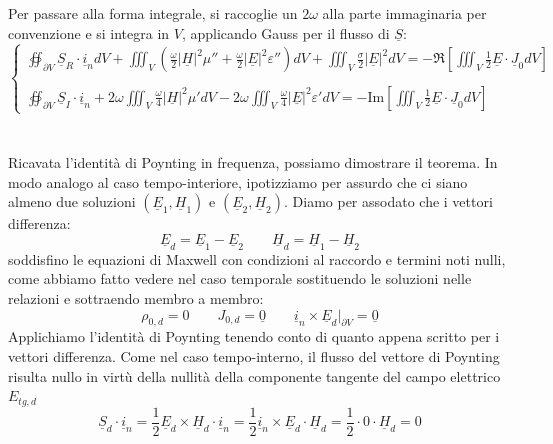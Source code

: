 \documentclass{book}
\begin{document}
        Per passare alla forma integrale, si raccoglie un $2\omega$ alla parte immaginaria per convenzione e si integra in $V$, applicando Gauss per il flusso di $\underline{S}$:
        \begin{equation}
            \begin{cases}
             \displaystyle \oiint_{\partial V}  \underline{S}_{R} \cdot \underline{i}_{n}dV+\iiint_{V} (\frac{\omega}{2}|\underline{H}|^{2}\mu''+\frac{\omega}{2}|\underline{E}|^{2}\varepsilon'')dV+\iiint_{V}\frac{\sigma}{2}|\underline{E}|^{2}dV=-\Re[\iiint_{V}\frac{1}{2}\underline{E}\cdot \underline{J}_{0} dV] \\ \\
             \displaystyle \oiint_{\partial V}  \underline{S}_{I} \cdot \underline{i}_{n}+ 2 \omega\iiint_{V} \frac{\omega}{4}|\underline{H}|^{2}\mu'dV-2 \omega\iiint_{V}\frac{\omega}{4}|\underline{E}|^{2}\varepsilon'dV=-\textrm{Im}[\iiint_{V}\frac{1}{2}\underline{E}\cdot \underline{J}_{0}dV]
        \end{cases}
        \end{equation}
         \\ \\
         Ricavata l'identità di Poynting in frequenza, possiamo dimostrare il teorema. In modo analogo al caso tempo-interiore, ipotizziamo per assurdo che ci siano almeno due soluzioni $(\underline{E}_{1}, \underline{H}_{1})$ e $(\underline{E}_{2}, \underline{H}_{2})$. Diamo per assodato che i vettori differenza:
         \begin{equation}
             \underline{E}_{d} = \underline{E}_{1}-\underline{E}_{2} \qquad \underline{H}_{d}=\underline{H}_{1}-\underline{H}_{2}
         \end{equation}
         soddisfino le equazioni di Maxwell con condizioni al raccordo e termini noti nulli, come abbiamo fatto vedere nel caso temporale sostituendo le soluzioni nelle relazioni e sottraendo membro a membro:
         \begin{equation}
             \rho_{0, d} = 0 \qquad J_{0, d} = \underline{0} \qquad  \underline{i}_{n} \times \underline{E}_{d}|_{\partial V}  = \underline{0}
         \end{equation}
         Applichiamo l'identità di Poynting tenendo conto di quanto appena scritto per i vettori differenza. Come nel caso tempo-interno, il flusso del vettore di Poynting risulta nullo in virtù della nullità della componente tangente del campo elettrico $E_{tg, d}$
         \begin{equation}
             \underline{S}_{d} \cdot \underline{i}_{n}=\frac{1}{2} \underline{E}_{d} \times \underline{H}_{d} \cdot \underline{i}_{n} =\frac{1}{2} \underline{i}_{n} \times \underline{E}_{d} \cdot \underline{H}_{d} = \frac{1}{2} \cdot 0 \cdot \underline{H}_{d} = 0
         \end{equation}
\end{document}
